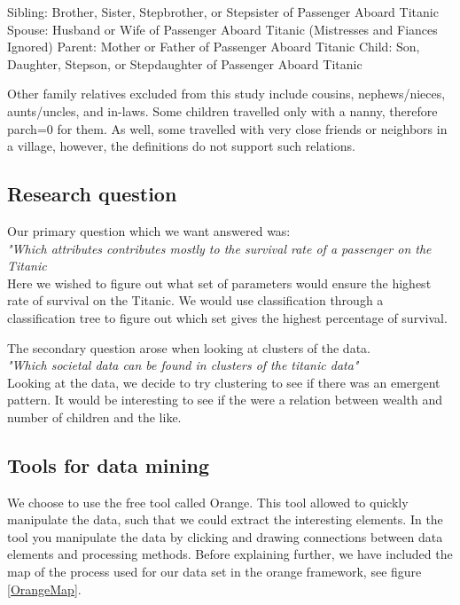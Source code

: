 \documentclass[a4paper,11pt]{article}
\begin{document}
Sibling:  Brother, Sister, Stepbrother, or Stepsister of Passenger Aboard Titanic
Spouse:   Husband or Wife of Passenger Aboard Titanic (Mistresses and Fiances Ignored)
Parent:   Mother or Father of Passenger Aboard Titanic
Child:    Son, Daughter, Stepson, or Stepdaughter of Passenger Aboard Titanic

Other family relatives excluded from this study include cousins,
nephews/nieces, aunts/uncles, and in-laws.  Some children travelled
only with a nanny, therefore parch=0 for them.  As well, some
travelled with very close friends or neighbors in a village, however,
the definitions do not support such relations.
\subsection{Research question}
Our primary question which we want answered was:\\
\textit{"Which attributes contributes mostly to the survival rate of a passenger on the Titanic}\\
Here we wished to figure out what set of parameters would ensure the highest rate of survival on the Titanic. We would use classification through a classification tree to figure out which set gives the highest percentage of survival.

The secondary question arose when looking at clusters of the data.\\
\textit{"Which societal data can be found in clusters of the titanic data"}\\
Looking at the data, we decide to try clustering to see if there was an emergent pattern. It would be interesting to see if the were a relation between wealth and number of children and the like. 
\subsection{Tools for data mining}
We choose to use the free tool called Orange\cite{orange}. This tool allowed to quickly manipulate the data, such that we could extract the interesting elements. 
In the tool you manipulate the data by clicking and drawing connections between data elements and processing methods. Before explaining further, we have included the map of the process used for our data set in the orange framework, see figure \ref{OrangeMap}.
\end{document}

